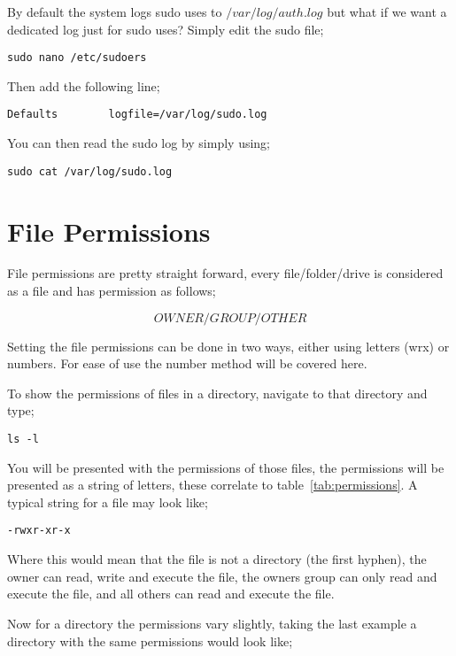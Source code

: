 By default the system logs sudo uses to $/var/log/auth.log$ but what if we want a dedicated log just for sudo uses?  Simply edit the sudo file;

\begin{lstlisting}
sudo nano /etc/sudoers
\end{lstlisting}

Then add the following line;

\begin{verbatim}
Defaults        logfile=/var/log/sudo.log
\end{verbatim}

You can then read the sudo log by simply using;

\begin{lstlisting}
sudo cat /var/log/sudo.log
\end{lstlisting}

\section{File Permissions}
\label{ssec:fileperm}

File permissions are pretty straight forward, every file/folder/drive is considered as a file and has permission as follows;

$$
OWNER/GROUP/OTHER
$$

Setting the file permissions can be done in two ways, either using letters (wrx) or numbers.  For ease of use the number method will be covered here.

To show the permissions of files in a directory, navigate to that directory and type;

\begin{lstlisting}
ls -l
\end{lstlisting}

You will be presented with the permissions of those files, the permissions will be presented as a string of letters, these correlate to table~\ref{tab:permissions}.  A typical string for a file may look like;

\begin{verbatim}
-rwxr-xr-x
\end{verbatim}

Where this would mean that the file is not a directory (the first hyphen), the owner can read, write and execute the file, the owners group can only read and execute the file, and all others can read and execute the file.

Now for a directory the permissions vary slightly, taking the last example a directory with the same permissions would look like;

